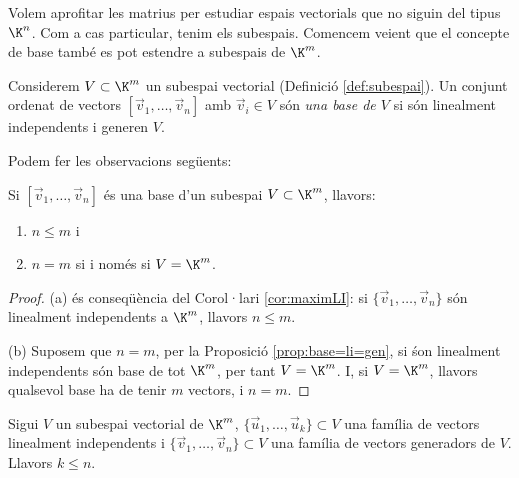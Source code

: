 Volem aprofitar les matrius per estudiar espais vectorials que no siguin del tipus $\K^n$. Com a cas particular, tenim els subespais. Comencem veient que el concepte de base també es pot estendre a subespais de $\K^m$. 
\begin{definicio}
Considerem $V\subset \K^m$ un subespai vectorial (Definició \ref{def:subespai}). Un conjunt ordenat de vectors $[\vec v_1, \dots, \vec v_n]$ amb $\vec v_i \in V$ són \emph{una base de $V$} si són linealment independents i generen $V$.
\end{definicio}
Podem fer les observacions següents:
\begin{proposicio}
Si $[\vec v_1, \dots, \vec v_n]$ és una base d'un subespai $V\subset \K^m$, llavors:
    \begin{enumerate}[\rm (a)]
        \item  $n\leq m$ i
        \item $n=m$ si i només si $V=\K^m$.
    \end{enumerate}
\end{proposicio}
\begin{proof}
    (a) és conseqüència del Corol·lari \ref{cor:maximLI}: si $\{ \vec v_1, \dots, \vec v_n \}$ són linealment independents a $\K^m$, llavors $n\leq m$.
    
    (b) Suposem que $n=m$, per la Proposició \ref{prop:base=li=gen}, si śon linealment independents són base de tot $\K^m$, per tant $V=\K^m$. I, si $V=\K^m$, llavors qualsevol base ha de tenir $m$ vectors, i $n=m$.
\end{proof}
\begin{observacio}
    Sigui $V$ un subespai vectorial de $\K^m$, $\{\vec u_1,\dots,\vec u_k\}\subset V$ una família de vectors linealment independents i $\{\vec v_1,\dots,\vec v_n\}\subset V$ una família de vectors generadors de $V$. Llavors $k\leq n$.
\end{observacio} 
